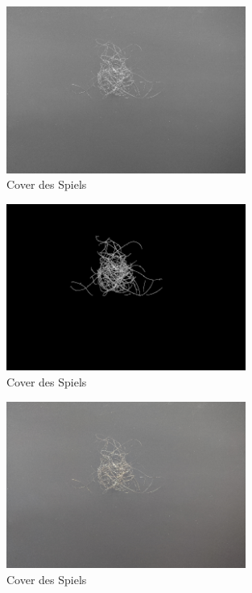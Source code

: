 \documentclass[german,a4paper, 12pt]{scrartcl}
\begin{document}
\begin{figure}
	\centering
	\includegraphics[width=0.7\textwidth]{figBina/05inverted gray.png}
	\caption[]{Cover des Spiels}
	\label{img:Bina01}
\end{figure}
\begin{figure}
	\centering
	\includegraphics[width=0.7\textwidth]{figBina/06small regions removed.png}
	\caption[]{Cover des Spiels}
	\label{img:Bina01}
\end{figure}
\begin{figure}
	\centering
	\includegraphics[width=0.7\textwidth]{figBina/07orig.png}
	\caption[]{Cover des Spiels}
	\label{img:Bina01}
\end{figure}
\end{document}
